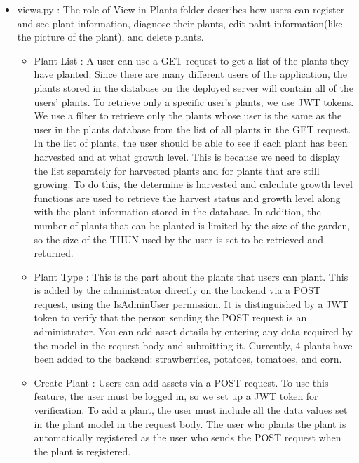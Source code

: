 \documentclass[conference, a4paper]{IEEEtran}
\begin{document}
\begin{enumerate}
\begin{itemize}
\begin{itemize}
        \item views.py : The role of View in Plants folder describes how users can register and see plant information, diagnose their plants, edit palnt information(like the picture of the plant), and delete plants.
        \begin{itemize}
            \item Plant List : A user can use a GET request to get a list of the plants they have planted. Since there are many different users of the application, the plants stored in the database on the deployed server will contain all of the users' plants. To retrieve only a specific user's plants, we use JWT tokens. We use a filter to retrieve only the plants whose user is the same as the user in the plants database from the list of all plants in the GET request. In the list of plants, the user should be able to see if each plant has been harvested and at what growth level. This is because we need to display the list separately for harvested plants and for plants that are still growing. To do this, the determine is harvested and calculate growth level functions are used to retrieve the harvest status and growth level along with the plant information stored in the database. In addition, the number of plants that can be planted is limited by the size of the garden, so the size of the TIIUN used by the user is set to be retrieved and returned. \\
            \item Plant Type : This is the part about the plants that users can plant. This is added by the administrator directly on the backend via a POST request, using the IsAdminUser permission. It is distinguished by a JWT token to verify that the person sending the POST request is an administrator. You can add asset details by entering any data required by the model in the request body and submitting it. Currently, 4 plants have been added to the backend: strawberries, potatoes, tomatoes, and corn. \\
            \item Create Plant : Users can add assets via a POST request. To use this feature, the user must be logged in, so we set up a JWT token for verification. To add a plant, the user must include all the data values set in the plant model in the request body. The user who plants the plant is automatically registered as the user who sends the POST request when the plant is registered. \\

\end{itemize}
\end{itemize}
\end{itemize}
\end{enumerate}
\end{document}
